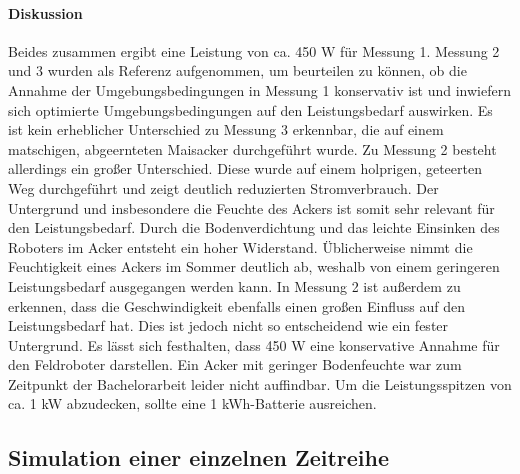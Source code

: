 \paragraph{Diskussion}
Beides zusammen ergibt eine Leistung von ca. 450 W für Messung 1.
Messung 2 und 3 wurden als Referenz aufgenommen, um beurteilen zu können, ob die Annahme der Umgebungsbedingungen in Messung 1 konservativ ist und inwiefern sich optimierte Umgebungsbedingungen auf den Leistungsbedarf auswirken. Es ist kein erheblicher Unterschied zu Messung 3 erkennbar, die auf einem matschigen, abgeernteten Maisacker durchgeführt wurde. Zu Messung 2 besteht allerdings ein großer Unterschied. Diese wurde auf einem holprigen, geteerten Weg durchgeführt und zeigt deutlich reduzierten Stromverbrauch. Der Untergrund und insbesondere die Feuchte des Ackers ist somit sehr relevant für den Leistungsbedarf. Durch die Bodenverdichtung und das leichte Einsinken des Roboters im Acker entsteht ein hoher Widerstand. Üblicherweise nimmt die Feuchtigkeit eines Ackers im Sommer deutlich ab, weshalb von einem geringeren Leistungsbedarf ausgegangen werden kann. In Messung 2 ist außerdem zu erkennen, dass die Geschwindigkeit ebenfalls einen großen Einfluss auf den Leistungsbedarf hat. Dies ist jedoch nicht so entscheidend wie ein fester Untergrund. Es lässt sich festhalten, dass 450 W eine konservative Annahme für den Feldroboter darstellen. Ein Acker mit geringer Bodenfeuchte war zum Zeitpunkt der Bachelorarbeit leider nicht auffindbar. Um die Leistungsspitzen von ca. 1 kW abzudecken, sollte eine 1 kWh-Batterie ausreichen.

\subsection{Simulation einer einzelnen Zeitreihe}
